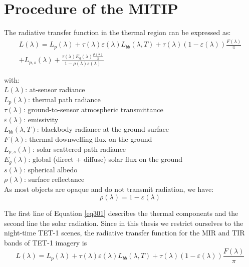 
\section{Procedure of the MITIP}

The radiative transfer function in the thermal region can be expressed as:
\begin{equation}
\begin{aligned}
\label{eq301}
L(\lambda) = L_p(\lambda) + \tau (\lambda) \varepsilon (\lambda) L_{bb}(\lambda, T) + \tau (\lambda) (1 - \varepsilon (\lambda)) \frac{F(\lambda)}{\pi}\\
+L_{p,s}(\lambda) + \frac{\tau (\lambda) E_g(\lambda) \frac{\rho (\lambda)}{\pi}}{1 - \rho (\lambda) s(\lambda)}
\end{aligned}
\end{equation}

\noindent with:\\
\indent $L(\lambda)$: at-sensor radiance\\
\indent $L_p(\lambda)$: thermal path radiance\\
\indent $\tau (\lambda)$: ground-to-sensor atmospheric transmittance\\
\indent $\varepsilon (\lambda)$: emissivity\\
\indent $L_{bb}(\lambda, T)$: blackbody radiance at the ground surface\\
\indent $F(\lambda)$: thermal downwelling flux on the ground\\
\indent $L_{p, s}(\lambda)$: solar scattered path radiance\\
\indent $E_g(\lambda)$: global (direct + diffuse) solar flux on the ground\\
\indent $s(\lambda)$: spherical albedo\\
\indent $\rho (\lambda)$: surface reflectance\\

\noindent As most objects are opaque and do not transmit radiation, we have:
\begin{equation}
\label{eq302}
\rho (\lambda) = 1 - \varepsilon (\lambda)
\end{equation}

\noindent The first line of Equation \eqref{eq301} describes the thermal components and the second line the solar radiation. Since in this thesis we restrict ourselves to the night-time TET-1 scenes, the radiative transfer function for the MIR and TIR bands of TET-1 imagery is
\begin{equation}
\label{eq303}
L(\lambda) = L_p(\lambda) + \tau (\lambda) \varepsilon (\lambda) L_{bb}(\lambda, T) + \tau (\lambda) (1 - \varepsilon (\lambda)) \frac{F(\lambda)}{\pi}
\end{equation}

